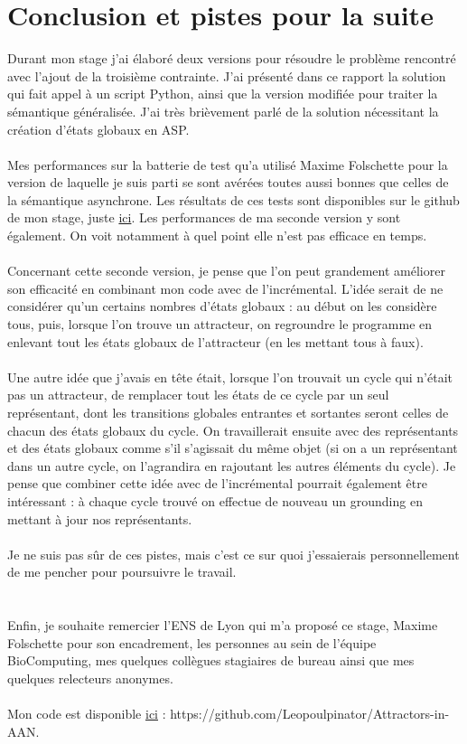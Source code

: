 \documentclass[12pt,a4paper]{article}
\begin{document}
\newpage
\section{Conclusion et pistes pour la suite}
Durant mon stage j'ai élaboré deux versions pour résoudre le problème rencontré avec l'ajout de la troisième contrainte. J'ai présenté dans ce rapport la solution qui fait appel à un script Python, ainsi que la version modifiée 
pour traiter la sémantique généralisée. J'ai très brièvement parlé de la solution nécessitant la création d'états globaux en ASP.\\ \\
Mes performances sur la batterie de test qu'a utilisé Maxime Folschette pour la version de laquelle je suis parti se sont avérées toutes aussi bonnes que celles de la sémantique asynchrone. Les résultats de ces tests sont 
disponibles sur le github de mon stage, juste \href{https://github.com/Leopoulpinator/Attractors-in-AAN/tree/main/versions/final_versions}{ici}. Les performances de ma seconde version y sont également. On voit notamment à quel point 
elle n'est pas efficace en temps.\\ \\
Concernant cette seconde version, je pense que l'on peut grandement améliorer son efficacité en combinant mon code avec de l'incrémental. L'idée serait de ne considérer qu'un certains nombres d'états globaux : au début on les 
considère tous, puis, lorsque l'on trouve un attracteur, on regroundre le programme en enlevant tout les états globaux de l'attracteur (en les mettant tous à faux).\\ \\
Une autre idée que j'avais en tête était, lorsque l'on trouvait un cycle qui n'était pas un attracteur, de remplacer tout les états de ce cycle par un seul représentant, dont les transitions globales entrantes et sortantes 
seront celles de chacun des états globaux du cycle. On travaillerait ensuite avec des représentants et des états globaux comme s'il s'agissait du même objet (si on a un représentant dans un autre cycle, on l'agrandira en rajoutant 
les autres éléments du cycle). Je pense que combiner cette idée avec de l'incrémental pourrait également être intéressant : à chaque cycle trouvé on effectue de nouveau un grounding en mettant à jour nos représentants.\\ \\
Je ne suis pas sûr de ces pistes, mais c'est ce sur quoi j'essaierais personnellement de me pencher pour poursuivre le travail.\\ \\ \\
Enfin, je souhaite remercier l'ENS de Lyon qui m'a proposé ce stage, Maxime Folschette pour son encadrement, les personnes au sein de l'équipe BioComputing, mes quelques collègues stagiaires de bureau ainsi que mes quelques 
relecteurs anonymes.\\ \\
Mon code est disponible \href{https://github.com/Leopoulpinator/Attractors-in-AAN}{ici} : https://github.com/Leopoulpinator/Attractors-in-AAN.

\newpage

\end{document}
